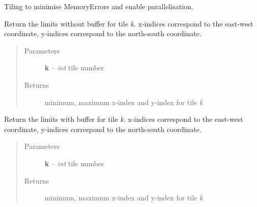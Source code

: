 \documentclass[letterpaper,10pt,english]{sphinxmanual}
\begin{document}
\begin{fulllineitems}
\label{docs/all_multipliers:all_multipliers.TileGrid}
Tiling to minimise MemoryErrors and enable parallelisation.


\begin{fulllineitems}
\label{docs/all_multipliers:all_multipliers.TileGrid.get_gridlimit}
Return the limits without buffer for tile \emph{k}. x-indices correspond to
the east-west coordinate, y-indices correspond to the north-south
coordinate.
\begin{quote}\begin{description}
\item[{Parameters}] \leavevmode
\textbf{k} -- \emph{int} tile number

\item[{Returns}] \leavevmode
minimum, maximum x-index and y-index for tile \emph{k}

\end{description}\end{quote}

\end{fulllineitems}



\begin{fulllineitems}
\label{docs/all_multipliers:all_multipliers.TileGrid.get_gridlimit_buffer}
Return the limits with buffer for tile \emph{k}. x-indices correspond to the
east-west coordinate, y-indices correspond to the north-south
coordinate.
\begin{quote}\begin{description}
\item[{Parameters}] \leavevmode
\textbf{k} -- \emph{int} tile number

\item[{Returns}] \leavevmode
minimum, maximum x-index and y-index for tile \emph{k}

\end{description}\end{quote}

\end{fulllineitems}



\end{fulllineitems}
\end{document}
